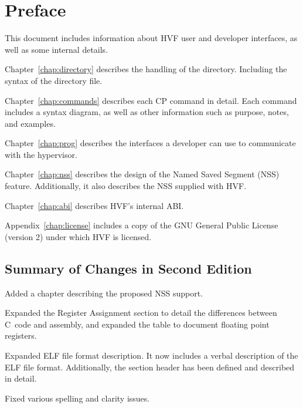 \chapter*{Preface}
This document includes information about HVF user and developer interfaces,
as well as some internal details.

Chapter~\ref{chap:directory} describes the handling of the directory.
Including the syntax of the directory file.

Chapter~\ref{chap:commands} describes each CP command in detail.  Each
command includes a syntax diagram, as well as other information such as
purpose, notes, and examples.

Chapter~\ref{chap:prog} describes the interfaces a developer can use to
communicate with the hypervisor.

\cbstart
Chapter~\ref{chap:nss} describes the design of the Named Saved Segment (NSS)
feature.  Additionally, it also describes the NSS supplied with HVF.
\cbend

Chapter~\ref{chap:abi} describes HVF's internal ABI.

Appendix~\ref{chap:license} includes a copy of the GNU General Public
License (version 2) under which HVF is licensed.

\cbstart
\section*{Summary of Changes in Second Edition}
Added a chapter describing the proposed NSS support.

Expanded the Register Assignment section to detail the differences between
C~code and assembly, and expanded the table to document floating point
registers.

Expanded ELF file format description.  It now includes a verbal description
of the ELF file format.  Additionally, the section header has been defined
and described in detail.

Fixed various spelling and clarity issues.
\cbend
